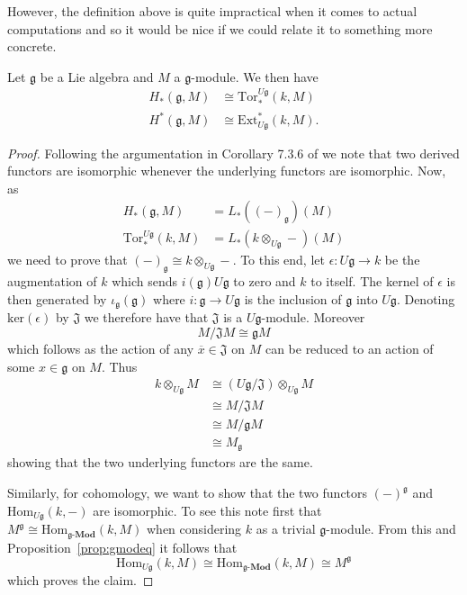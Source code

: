 However, the definition above is quite impractical when it comes to actual computations and so it would be nice if we could relate it to something more concrete.
\begin{proposition}
  \label{prop:torext}
  Let $ \mathfrak{g} $ be a Lie algebra and $ M $ a $ \mathfrak{g} $-module. We then have
  \begin{align*}
    H_*(\mathfrak{g}, M) &\cong \text{Tor}^{U\mathfrak{g}}_*(k, M) \\
    H^*(\mathfrak{g}, M) &\cong \text{Ext}^*_{U\mathfrak{g}}(k, M)
  .\end{align*}
\end{proposition}
\begin{proof}
  Following the argumentation in Corollary 7.3.6 of \cite{weibel1994homological} we note that two derived functors are isomorphic whenever the underlying functors are isomorphic. Now, as
  \begin{align*}
    H_*(\mathfrak{g}, M) &= L_*((-)_\mathfrak{g})(M) \\
    \text{Tor}_*^{U\mathfrak{g}}(k, M) &= L_*(k \otimes_{U\mathfrak{g}} -)(M)
  \end{align*}
  we need to prove that $ (-)_\mathfrak{g} \cong k \otimes_{U\mathfrak{g}} - $. To this end, let $ \epsilon: U\mathfrak{g} \to k $ be the augmentation of $ k $ which sends $ i(\mathfrak{g})U\mathfrak{g} $ to zero and $ k $ to itself. The kernel of $ \epsilon $ is then generated by $ \iota_\mathfrak{g}(\mathfrak{g}) $ where $ i: \mathfrak{g} \to U\mathfrak{g} $ is the inclusion of $ \mathfrak{g} $ into $ U\mathfrak{g} $. Denoting $ \text{ker}(\epsilon) $ by $ \mathfrak{J} $ we therefore have that $ \mathfrak{J} $ is a $ U\mathfrak{g} $-module. Moreover
  \begin{equation}
    M/\mathfrak{J}M \cong \mathfrak{g}M
  \end{equation}
  which follows as the action of any $ \overline{x} \in \mathfrak{J} $ on $ M $ can be reduced to an action of some $ x \in \mathfrak{g} $ on $ M $.
  Thus
  \begin{align*}
    k \otimes_{U\mathfrak{g}} M &\cong (U\mathfrak{g}/\mathfrak{J}) \otimes_{U\mathfrak{g}} M \\
  &\cong M/\mathfrak{J}M \\
  &\cong M/\mathfrak{g}M \\
  &\cong M_\mathfrak{g}
\end{align*}
showing that the two underlying functors are the same.

Similarly, for cohomology, we want to show that the two functors $ (-)^\mathfrak{g} $ and $ \text{Hom}_{U\mathfrak{g}}(k, -) $ are isomorphic. To see this note first that $ M^\mathfrak{g} \cong \text{Hom}_{\mathfrak{g}\text{-}\mathbf{Mod}}(k, M) $ when considering $ k $ as a trivial $ \mathfrak{g} $-module. From this and Proposition~\ref{prop:gmodeq} it follows that
\begin{equation}
  \text{Hom}_{U\mathfrak{g}}(k, M) \cong \text{Hom}_{\mathfrak{g}\text{-}\mathbf{Mod}}(k, M) \cong M^{\mathfrak{g}}
  \label{eq:cohomsame}
\end{equation}
which proves the claim.
\end{proof}

